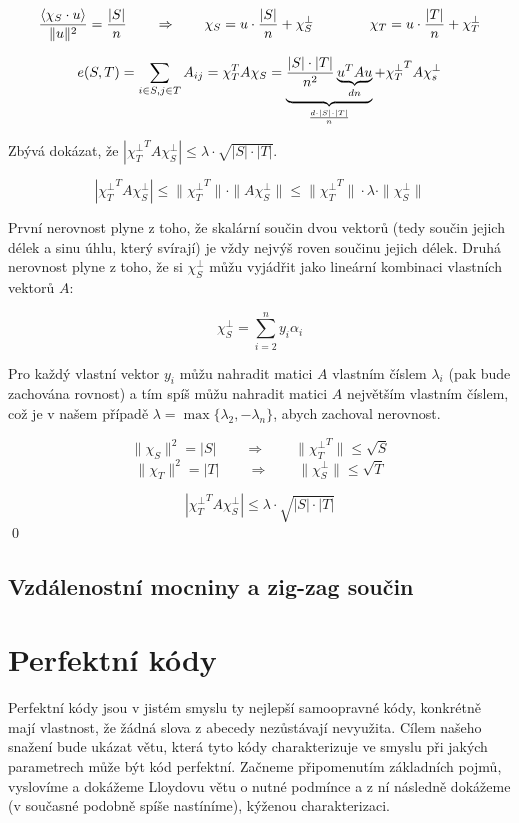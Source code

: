 \documentclass[a4paper,12pt,titlepage]{article}
\newcommand{\xttt}{{\chi_T^\bot}^T}
\newcommand{\sk}[1]{{\langle #1\rangle}}
\begin{document}
$${\sk{\chi_S \cdot u} \over \|u\|^2} = {|S|\over n} \qquad\Rightarrow\qquad \chi_S = u\cdot {|S|\over n} + \chi_S^\bot \qquad\qquad \chi_T = u\cdot {|T|\over n} + \chi_T^\bot$$

$$e(S,T) = \sum_{i\in S, j\in T} A_{ij} = \chi_T^TA\chi_S = \underbrace{{|S|\cdot |T| \over n^2} \underbrace{u^TAu}_{dn}}_{d\cdot |S|\cdot |T|\over n} + \xttt A\chi_s^\bot$$

Zbývá dokázat, že $|\xttt A\chi_S^\bot| \le \lambda\cdot\sqrt{|S|\cdot |T|}$.

$$|\xttt A\chi_S^\bot| \le \|\xttt \| \cdot \|A\chi_S^\bot\| \le \|\xttt\|\cdot\lambda\cdot\|\chi_S^\bot\|$$

První nerovnost plyne z toho, že skalární součin dvou vektorů (tedy součin
jejich délek a sinu úhlu, který svírají) je vždy nejvýš roven součinu jejich
délek. Druhá nerovnost plyne z toho, že si $\chi_S^\bot$ můžu vyjádřit jako
lineární kombinaci vlastních vektorů $A$:

$$\chi_S^\bot = \sum_{i=2}^n y_i\alpha_i$$

Pro každý vlastní vektor $y_i$ můžu nahradit matici $A$ vlastním číslem
$\lambda_i$ (pak bude zachována rovnost) a tím spíš můžu nahradit matici $A$
největším vlastním číslem, což je v našem případě $\lambda =
\max\{\lambda_2,-\lambda_n\}$, abych zachoval nerovnost.

$$\|\chi_S\|^2 = |S| \qquad\Rightarrow\qquad \|\xttt\| \le \sqrt S$$
$$\|\chi_T\|^2 = |T| \qquad\Rightarrow\qquad \|\chi_S^\bot\| \le \sqrt T$$

$$|\xttt A\chi_S^\bot| \le \lambda\cdot\sqrt{|S|\cdot |T|}$$
\qed


\subsection{Vzdálenostní mocniny a zig-zag součin}

\section{Perfektní kódy}

Perfektní kódy jsou v jistém smyslu ty nejlepší samoopravné kódy, konkrétně mají vlastnost, že žádná slova z abecedy nezůstávají nevyužita. Cílem našeho snažení bude ukázat větu, která tyto kódy charakterizuje ve smyslu při jakých parametrech může být kód perfektní. Začneme připomenutím základních pojmů, vyslovíme a dokážeme Lloydovu větu o nutné podmínce a z ní následně dokážeme (v současné podobně spíše nastíníme), kýženou charakterizaci.
\end{document}
